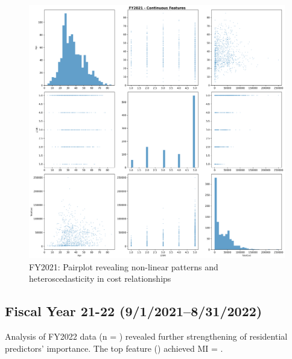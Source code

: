 \newpage

\vspace*{\fill}
\begin{figure}[htbp]
\centering
\includegraphics[width=\textwidth]{fy2021_pairplot_top_features.png}
\caption{FY2021: Pairplot revealing non-linear patterns and heteroscedasticity in cost relationships}
\end{figure}
\vspace*{\fill}

\newpage

\subsection{Fiscal Year 21-22  (9/1/2021--8/31/2022)}

Analysis of FY2022 data (n = \FSRecordsFinalFYTwoThousandTwentyTwo) revealed further strengthening of residential predictors' importance. The top feature (\FSTopFeatureFYTwoThousandTwentyTwo) achieved MI = \FSTopMIFYTwoThousandTwentyTwo.

